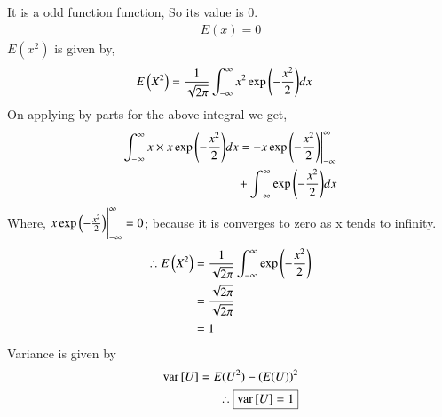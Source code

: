 \documentclass[journal,12pt,twocolumn]{IEEEtran}
\begin{document}
    It is a odd function function, So its value is 0.
    \begin{align}
        \boxed{E(x)=0}
    \end{align}
 $E({x^2})$ is given by,
    \begin{align}
		&	E\left(X^2\right) = \frac{1}{\sqrt{2\pi}}\int_{-\infty}^{\infty}x^2\exp{\left(-\frac{x^2}{2}\right)}dx 
	\end{align}
On applying by-parts for the above integral we get,
    \begin{align}
        \int_{-\infty}^{\infty}x \times x \exp{\left(-\frac{x^2}{2}\right)}dx = -x\exp\left(-\frac{x^2}{2}\right)\Biggr|_{-\infty}^{\infty}& \\ +\int_{-\infty}^{\infty}\exp{\left(-\frac{x^2}{2}\right)} dx
    \end{align}		
Where, $x\exp\left(-\frac{x^2}{2}\right)\Biggr|_{-\infty}^{\infty} = 0$; because it is converges to zero as x tends to infinity.
    \begin{align}
       \therefore E\left(X^2\right) &= \frac{1}{\sqrt{2\pi}}\int_{-\infty}^{\infty} \exp\left(-\frac{x^2}{2}\right) \\
                    &= \frac{\sqrt{2\pi}}{\sqrt{2\pi}} \\
                    &= 1
    \end{align}
Variance is given by
    \begin{align}
        \text{var}{}\left[U\right]=E(U^2)-(E(U))^2\\
        \therefore \boxed{\text{var}{}\left[U\right]=1}
    \end{align}


\end{document}
